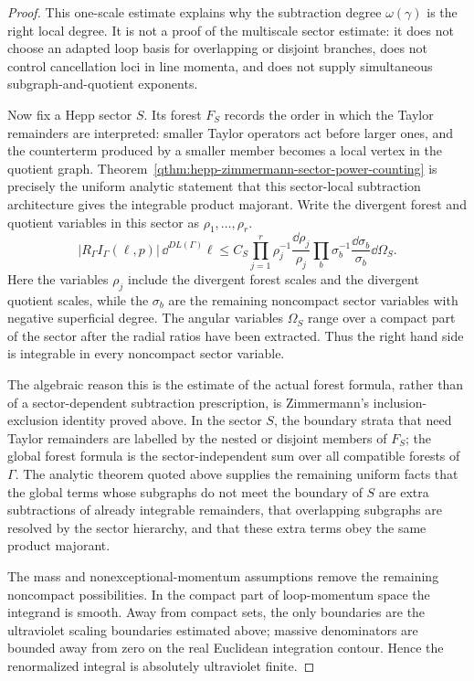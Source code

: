 \begin{proof}
This one-scale estimate explains why the subtraction degree
\(\omega(\gamma)\) is the right local degree.  It is not a proof of the
multiscale sector estimate: it does not choose an adapted loop basis for
overlapping or disjoint branches, does not control cancellation loci in line
momenta, and does not supply simultaneous subgraph-and-quotient exponents.

Now fix a Hepp sector \(S\).  Its forest \(F_S\) records the order in which the
Taylor remainders are interpreted: smaller Taylor operators act before larger
ones, and the counterterm produced by a smaller member becomes a local vertex
in the quotient graph.  Theorem~\ref{qthm:hepp-zimmermann-sector-power-counting}
is precisely the uniform analytic statement that this sector-local subtraction
architecture gives the integrable product majorant.  Write the divergent
forest and quotient variables in this sector as \(\rho_1,\ldots,\rho_r\).
\begin{equation}
  |R_\Gamma I_\Gamma(\ell,p)|\,\dd^{D L(\Gamma)}\ell
  \le
  C_S
  \prod_{j=1}^r
    \rho_j^{-1}\frac{\dd\rho_j}{\rho_j}
  \prod_b
    \sigma_b^{-1}\frac{\dd\sigma_b}{\sigma_b}
  \dd\Omega_S .
  \label{eq:bphz-sector-product-bound}
\end{equation}
Here the variables \(\rho_j\) include the divergent forest scales and the
divergent quotient scales, while the \(\sigma_b\) are the remaining
noncompact sector variables with negative superficial degree.  The angular
variables \(\Omega_S\) range over a compact part of the sector after the
radial ratios have been extracted.  Thus the right hand side is integrable in
every noncompact sector variable.

The algebraic reason this is the estimate of the actual forest formula, rather
than of a sector-dependent subtraction prescription, is Zimmermann's
inclusion-exclusion identity proved above.  In the sector \(S\), the boundary
strata that need Taylor remainders are labelled by the nested or disjoint
members of \(F_S\); the global forest formula is the sector-independent sum
over all compatible forests of \(\Gamma\).  The analytic theorem quoted above
supplies the remaining uniform facts that the global terms whose subgraphs do
not meet the boundary of \(S\) are extra subtractions of already integrable
remainders, that overlapping subgraphs are resolved by the sector hierarchy,
and that these extra terms obey the same product majorant.

The mass and nonexceptional-momentum assumptions remove the remaining
noncompact possibilities.  In the compact part of loop-momentum space the
integrand is smooth.  Away from compact sets, the only boundaries are the
ultraviolet scaling boundaries estimated above; massive denominators are
bounded away from zero on the real Euclidean integration contour.  Hence the
renormalized integral is absolutely ultraviolet finite.


\end{proof}
